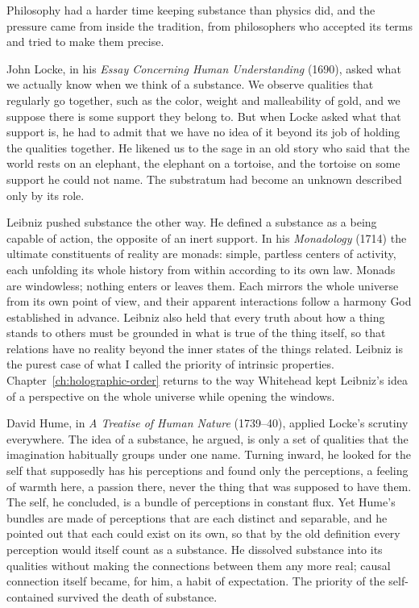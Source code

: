 Philosophy had a harder time keeping substance than physics did, and the pressure came from inside the tradition, from philosophers who accepted its terms and tried to make them precise.

John Locke, in his \textit{Essay Concerning Human Understanding} (1690), asked what we actually know when we think of a substance. We observe qualities that regularly go together, such as the color, weight and malleability of gold, and we suppose there is some support they belong to. But when Locke asked what that support is, he had to admit that we have no idea of it beyond its job of holding the qualities together. He likened us to the sage in an old story who said that the world rests on an elephant, the elephant on a tortoise, and the tortoise on some support he could not name. The substratum had become an unknown described only by its role.

Leibniz pushed substance the other way. He defined a substance as a being capable of action, the opposite of an inert support. In his \textit{Monadology} (1714) the ultimate constituents of reality are monads: simple, partless centers of activity, each unfolding its whole history from within according to its own law. Monads are windowless; nothing enters or leaves them. Each mirrors the whole universe from its own point of view, and their apparent interactions follow a harmony God established in advance. Leibniz also held that every truth about how a thing stands to others must be grounded in what is true of the thing itself, so that relations have no reality beyond the inner states of the things related. Leibniz is the purest case of what I called the priority of intrinsic properties. Chapter~\ref{ch:holographic-order} returns to the way Whitehead kept Leibniz's idea of a perspective on the whole universe while opening the windows.

David Hume, in \textit{A Treatise of Human Nature} (1739--40), applied Locke's scrutiny everywhere. The idea of a substance, he argued, is only a set of qualities that the imagination habitually groups under one name. Turning inward, he looked for the self that supposedly has his perceptions and found only the perceptions, a feeling of warmth here, a passion there, never the thing that was supposed to have them. The self, he concluded, is a bundle of perceptions in constant flux. Yet Hume's bundles are made of perceptions that are each distinct and separable, and he pointed out that each could exist on its own, so that by the old definition every perception would itself count as a substance. He dissolved substance into its qualities without making the connections between them any more real; causal connection itself became, for him, a habit of expectation. The priority of the self-contained survived the death of substance.

